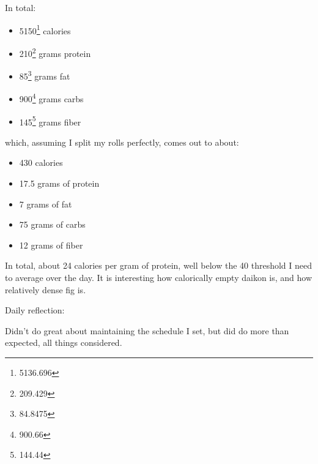 \documentclass[12pt]{article}[titlepage]
\renewcommand{\,}{\textsuperscript{,}}
\begin{document}
In total:  
\begin{itemize}  
\item 5150\footnote{5136.696} calories  
\item 210\footnote{209.429} grams protein  
\item 85\footnote{84.8475} grams fat  
\item 900\footnote{900.66} grams carbs  
\item 145\footnote{144.44} grams fiber  
\end{itemize}  
which, assuming I split my rolls perfectly, comes out to about:

\begin{itemize}  
\item 430 calories  
\item 17.5 grams of protein  
\item 7 grams of fat  
\item 75 grams of carbs  
\item 12 grams of fiber  
\end{itemize}  
  
In total, about 24 calories per gram of protein, well below the 40 threshold I need to average over the day.  
It is interesting how calorically empty daikon is, and how relatively dense fig is.

  


Daily reflection:  


Didn't do great about maintaining the schedule I set, but did do more than expected, all things considered.  
\end{document}
